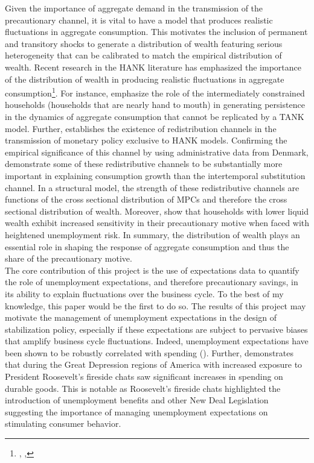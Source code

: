 \documentclass[titlepage]{\econtex}\providecommand{\texname}{Dissertation-Proposal}
\begin{document}
Given the importance of aggregate demand in the transmission of the precautionary channel, it is vital to have a model that produces realistic fluctuations in aggregate consumption. This motivates the inclusion of permanent and transitory shocks to generate a distribution of wealth featuring serious heterogeneity that can be calibrated to match the empirical distribution of wealth. Recent research in the HANK literature has emphasized the importance of the distribution of wealth in producing realistic fluctuations in aggregate consumption\footnote{\cite{auclert2018intertemporal}, \cite{patterson2019matching} ,\cite{kaplan2018monetary}}. For instance, \cite{auclert2018intertemporal}  emphasize the role of the intermediately constrained households (households that are nearly hand to mouth) in generating persistence in the dynamics of aggregate consumption that cannot be replicated by a TANK model. Further, \cite{auclert2019monetary} establishes the existence of redistribution channels in the transmission of monetary policy exclusive to HANK models. Confirming the empirical significance of this channel by using administrative data from Denmark, \cite{crawley2020consumption} demonstrate some of these redistributive channels to be substantially more important in explaining consumption growth than the intertemporal substitution channel. In a structural model, the strength of these redistributive channels are functions of the cross sectional distribution of MPCs and therefore the cross sectional distribution of wealth. Moreover, \cite{heathcote2018wealth} show that households with lower liquid wealth exhibit increased sensitivity in their precautionary motive when faced with heightened unemployment risk. In summary, the distribution of wealth plays an essential role in shaping the response of aggregate consumption and thus the share of the precautionary motive. \\

The core contribution of this project is the use of expectations data to quantify the role of unemployment expectations, and therefore precautionary savings, in its ability to explain fluctuations over the business cycle. To the best of my knowledge, this paper would be the first to do so. The results of this project may motivate the management of unemployment expectations in the design of stabilization policy, especially if these expectations are subject to pervasive biases that amplify business cycle fluctuations. Indeed, unemployment expectations have been shown to be robustly correlated with spending (\cite{carroll1997unemployment}). Further, \cite{pedemonte2020fireside} demonstrates that during the Great Depression regions of America with increased exposure to President Roosevelt's fireside chats saw significant increases in spending on durable goods. This is notable as Roosevelt's fireside chats highlighted the introduction of unemployment benefits and other New Deal Legislation suggesting the importance of managing unemployment expectations on stimulating consumer behavior. \\
\end{document}
